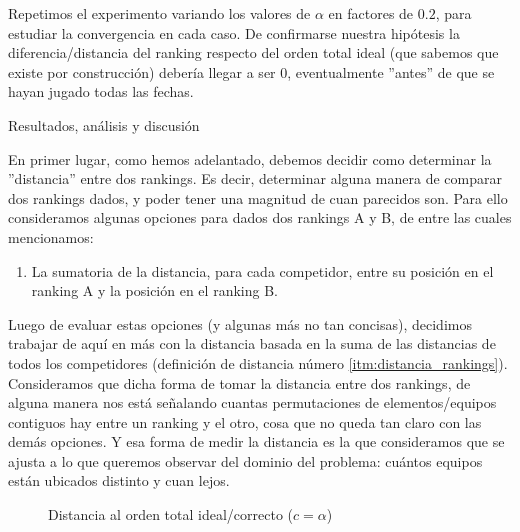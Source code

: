 \begin{LaTeXdescription}
        \par Repetimos el experimento variando los valores de $\alpha$ en
        factores de $0.2$, para estudiar la convergencia en cada caso.  De
        confirmarse nuestra hip\'otesis la diferencia/distancia del ranking
        respecto del orden total ideal (que sabemos que existe por
        construcci\'on) deber\'ia llegar a ser 0, eventualmente ''antes'' de que
        se hayan jugado todas las fechas.\\

    \item[Resultados, an\'alisis y discusi\'on]
\end{LaTeXdescription}

\par En primer lugar, como hemos adelantado, debemos decidir como determinar la
''distancia'' entre dos rankings. Es decir, determinar alguna manera de comparar
dos rankings dados, y poder tener una magnitud de cuan parecidos son. Para ello
consideramos algunas opciones para dados dos rankings A y B, de entre las cuales
mencionamos:

\begin{enumerate}
        \item La sumatoria de la distancia, para cada competidor, entre su
            posici\'on en el ranking A y la posici\'on en el ranking
            B.\label{itm:distancia_rankings}
\end{enumerate}

\par Luego de evaluar estas opciones (y algunas m\'as no tan concisas),
decidimos trabajar de aqu\'i en m\'as con la distancia basada en la suma de las
distancias de todos los competidores (definici\'on de distancia n\'umero
\ref{itm:distancia_rankings}). Consideramos que dicha forma de tomar la
distancia entre dos rankings, de alguna manera nos est\'a se\~nalando cuantas
permutaciones de elementos/equipos contiguos hay entre un ranking y el otro,
cosa que no queda tan claro con las dem\'as opciones. Y esa forma de medir la
distancia es la que consideramos que se ajusta a lo que queremos observar del
dominio del problema: cu\'antos equipos est\'an ubicados distinto y cuan lejos.

\begin{figure}[H]
    \centering
    \caption{Distancia al orden total ideal/correcto ($c = \alpha$)}
    \label{fig:exp5}
\end{figure}

